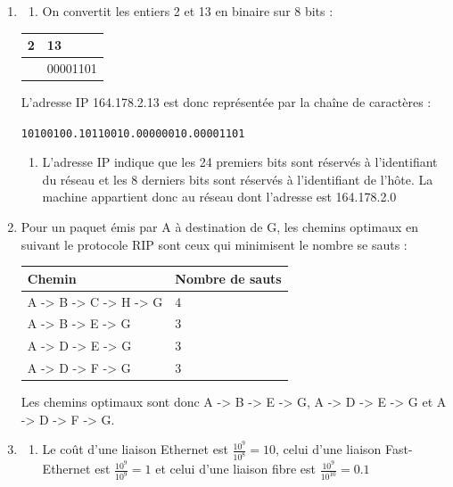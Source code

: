 \documentclass[
  letterpaper,
  DIV=11,
  numbers=noendperiod]{scrartcl}
\providecommand{\tightlist}{%
  \setlength{\itemsep}{0pt}\setlength{\parskip}{0pt}}\usepackage{longtable,booktabs,array}
\begin{document}
\begin{enumerate}
\def\labelenumi{\arabic{enumi}.}
\item
  \begin{enumerate}
  \def\labelenumii{\alph{enumii}.}
  \tightlist
  \item
    On convertit les entiers 2 et 13 en binaire sur 8 bits :
  \end{enumerate}

  \begin{longtable}[]{@{}ll@{}}
  \toprule\noalign{}
  2 & 13 \\
  \midrule\noalign{}
  \endhead
  \bottomrule\noalign{}
  \endlastfoot
  00000010 & 00001101 \\
  \end{longtable}

  L'adresse IP 164.178.2.13 est donc représentée par la chaîne de
  caractères :

  \texttt{10100100.10110010.00000010.00001101}

  \begin{enumerate}
  \def\labelenumii{\alph{enumii}.}
  \setcounter{enumii}{1}
  \tightlist
  \item
    L'adresse IP indique que les 24 premiers bits sont réservés à
    l'identifiant du réseau et les 8 derniers bits sont réservés à
    l'identifiant de l'hôte. La machine appartient donc au réseau dont
    l'adresse est 164.178.2.0
  \end{enumerate}
\item
  Pour un paquet émis par A à destination de G, les chemins optimaux en
  suivant le protocole RIP sont ceux qui minimisent le nombre se sauts :

  \begin{longtable}[]{@{}ll@{}}
  \toprule\noalign{}
  Chemin & Nombre de sauts \\
  \midrule\noalign{}
  \endhead
  \bottomrule\noalign{}
  \endlastfoot
  A -\textgreater{} B -\textgreater{} C -\textgreater{} H
  -\textgreater{} G & 4 \\
  A -\textgreater{} B -\textgreater{} E -\textgreater{} G & 3 \\
  A -\textgreater{} D -\textgreater{} E -\textgreater{} G & 3 \\
  A -\textgreater{} D -\textgreater{} F -\textgreater{} G & 3 \\
  \end{longtable}

  Les chemins optimaux sont donc A -\textgreater{} B -\textgreater{} E
  -\textgreater{} G, A -\textgreater{} D -\textgreater{} E
  -\textgreater{} G et A -\textgreater{} D -\textgreater{} F
  -\textgreater{} G.
\item
  \begin{enumerate}
  \def\labelenumii{\alph{enumii}.}
  \tightlist
  \item
    Le coût d'une liaison Ethernet est \(\frac{10^9}{10^8}=10\), celui
    d'une liaison Fast-Ethernet est \(\frac{10^9}{10^9}=1\) et celui
    d'une liaison fibre est \(\frac{10^9}{10^{10}}=0.1\)
  \end{enumerate}


\end{enumerate}
\end{document}
